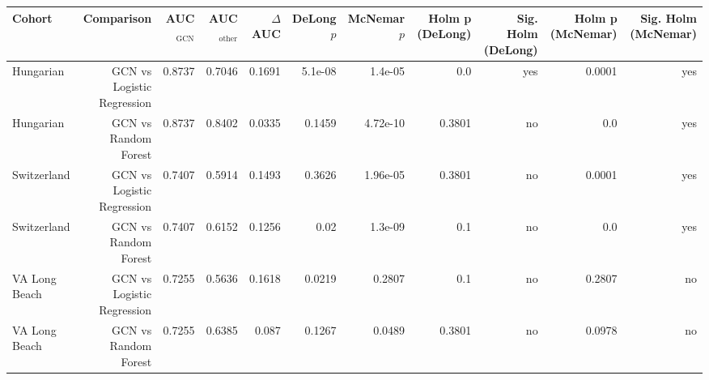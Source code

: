 \begin{table}[t]
{\begin{tabular}{lrrrrrrrrrr}
\toprule
Cohort & Comparison & AUC$_{\mathrm{GCN}}$ & AUC$_{\mathrm{other}}$ & $\Delta$AUC & DeLong $p$ & McNemar $p$ & Holm p (DeLong) & Sig. Holm (DeLong) & Holm p (McNemar) & Sig. Holm (McNemar) \\
\midrule
Hungarian & GCN vs Logistic Regression & 0.8737 & 0.7046 & 0.1691 & 5.1e-08 & 1.4e-05 & 0.0 & yes & 0.0001 & yes \\
Hungarian & GCN vs Random Forest & 0.8737 & 0.8402 & 0.0335 & 0.1459 & 4.72e-10 & 0.3801 & no & 0.0 & yes \\
Switzerland & GCN vs Logistic Regression & 0.7407 & 0.5914 & 0.1493 & 0.3626 & 1.96e-05 & 0.3801 & no & 0.0001 & yes \\
Switzerland & GCN vs Random Forest & 0.7407 & 0.6152 & 0.1256 & 0.02 & 1.3e-09 & 0.1 & no & 0.0 & yes \\
VA Long Beach & GCN vs Logistic Regression & 0.7255 & 0.5636 & 0.1618 & 0.0219 & 0.2807 & 0.1 & no & 0.2807 & no \\
VA Long Beach & GCN vs Random Forest & 0.7255 & 0.6385 & 0.087 & 0.1267 & 0.0489 & 0.3801 & no & 0.0978 & no \\
\bottomrule
\end{tabular}
}
\end{table}
